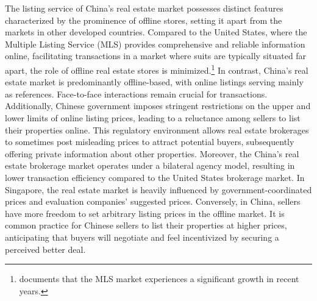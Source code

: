 \documentclass[11pt]{article}
\begin{document}
The listing service of China's real estate market possesses distinct features characterized by the prominence of offline stores, setting it apart from the markets in other developed countries. Compared to the United States, where the Multiple Listing Service (MLS) provides comprehensive and reliable information online, facilitating transactions in a market where suits are typically situated far apart, the role of offline real estate stores is minimized.\footnote{\citet{hendel_relative_2009} documents that the MLS market experiences a significant growth in recent years.} In contrast, China's real estate market is predominantly offline-based, with online listings serving mainly as references. Face-to-face interactions remain crucial for transactions. Additionally, Chinese government imposes stringent restrictions on the upper and lower limits of online listing prices, leading to a reluctance among sellers to list their properties online. This regulatory environment allows real estate brokerages to sometimes post misleading prices to attract potential buyers, subsequently offering private information about other properties. Moreover, the China's real estate brokerage market operates under a bilateral agency model, resulting in lower transaction efficiency compared to the United States brokerage market. In Singapore, the real estate market is heavily influenced by government-coordinated prices and evaluation companies' suggested prices. Conversely, in China, sellers have more freedom to set arbitrary listing prices in the offline market. It is common practice for Chinese sellers to list their properties at higher prices, anticipating that buyers will negotiate and feel incentivized by securing a perceived better deal.
\end{document}

